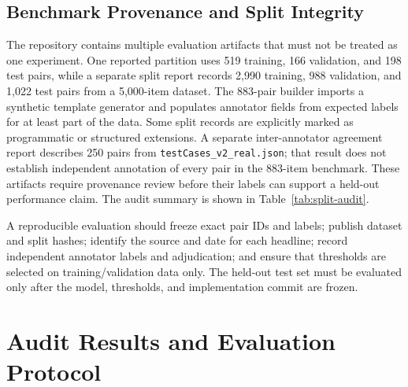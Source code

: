 \documentclass[conference]{IEEEtran}
\begin{document}
\subsection{Benchmark Provenance and Split Integrity}
The repository contains multiple evaluation artifacts that must not be treated as one experiment. One reported partition uses 519 training, 166 validation, and 198 test pairs, while a separate split report records 2,990 training, 988 validation, and 1,022 test pairs from a 5,000-item dataset. The 883-pair builder imports a synthetic template generator and populates annotator fields from expected labels for at least part of the data. Some split records are explicitly marked as programmatic or structured extensions. A separate inter-annotator agreement report describes 250 pairs from \texttt{testCases\_v2\_real.json}; that result does not establish independent annotation of every pair in the 883-item benchmark. These artifacts require provenance review before their labels can support a held-out performance claim. The audit summary is shown in Table~\ref{tab:split-audit}.

\begin{table}[!t]
\centering
\caption{Repository Audit of the 5,000-Record Dataset}
\label{tab:split-audit}
\end{table}

A reproducible evaluation should freeze exact pair IDs and labels; publish dataset and split hashes; identify the source and date for each headline; record independent annotator labels and adjudication; and ensure that thresholds are selected on training/validation data only. The held-out test set must be evaluated only after the model, thresholds, and implementation commit are frozen.

\section{Audit Results and Evaluation Protocol}
\end{document}
